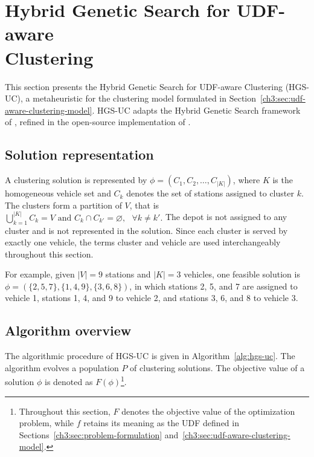 \section[Hybrid Genetic Search for UDF-aware Clustering]{Hybrid Genetic Search for UDF-aware\\ Clustering}\label{ch3:sec:hgs-uc}

This section presents the Hybrid Genetic Search for UDF-aware Clustering (HGS-UC), a metaheuristic for the clustering model formulated in Section~\ref{ch3:sec:udf-aware-clustering-model}. HGS-UC adapts the Hybrid Genetic Search framework of \citet{vidalHybridGeneticAlgorithm2012}, refined in the open-source implementation of \citet{vidalHybridGeneticSearch2022}.

\subsection{Solution representation}

A clustering solution is represented by $\phi =({{C}_{1}},{{C}_{2}},\ldots ,{{C}_{\left| K \right|}})$, where $K$ is the homogeneous vehicle set and ${{C}_{k}}$ denotes the set of stations assigned to cluster $k$. The clusters form a partition of $V$, that is $\bigcup\limits_{k=1}^{\left| K \right|}{{{C}_{k}}}=V\text{ and }{{C}_{k}}\cap {{C}_{{{k}'}}}=\varnothing ,\text{ }\forall k\ne {k}'.$ The depot is not assigned to any cluster and is not represented in the solution. Since each cluster is served by exactly one vehicle, the terms cluster and vehicle are used interchangeably throughout this section.

For example, given $\left| V \right|=9$ stations and $\left| K \right|=3$ vehicles, one feasible solution is $\phi =(\{2,5,7\},\{1,4,9\},\{3,6,8\})$, in which stations 2, 5, and 7 are assigned to vehicle 1, stations 1, 4, and 9 to vehicle 2, and stations 3, 6, and 8 to vehicle 3.

\subsection{Algorithm overview}

The algorithmic procedure of HGS-UC is given in Algorithm~\ref{alg:hgs-uc}. The algorithm evolves a population $P$ of clustering solutions. The objective value of a solution $\phi$ is denoted as $F(\phi)$\footnote{Throughout this section, $F$ denotes the objective value of the optimization problem, while $f$ retains its meaning as the UDF defined in Sections~\ref{ch3:sec:problem-formulation} and~\ref{ch3:sec:udf-aware-clustering-model}.}.

